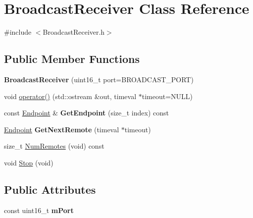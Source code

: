 \hypertarget{class_broadcast_receiver}{\section{Broadcast\-Receiver Class Reference}
\label{class_broadcast_receiver}
}


{\ttfamily \#include $<$Broadcast\-Receiver.\-h$>$}

\subsection*{Public Member Functions}
\begin{DoxyCompactItemize}
\item 
\hypertarget{class_broadcast_receiver_a9c3f8ebdef813f03edec75f88389a6ee}{{\bfseries Broadcast\-Receiver} (uint16\-\_\-t port=B\-R\-O\-A\-D\-C\-A\-S\-T\-\_\-\-P\-O\-R\-T)}\label{class_broadcast_receiver_a9c3f8ebdef813f03edec75f88389a6ee}

\item 
void \hyperlink{class_broadcast_receiver_ac2fa6c783d73121c800d3c015621964d}{operator()} (std\-::ostream \&out, timeval $\ast$timeout=N\-U\-L\-L)
\item 
\hypertarget{class_broadcast_receiver_aac4e2401b2cb7fdae40929bd896724f7}{const \hyperlink{class_endpoint}{Endpoint} \& {\bfseries Get\-Endpoint} (size\-\_\-t index) const }\label{class_broadcast_receiver_aac4e2401b2cb7fdae40929bd896724f7}

\item 
\hypertarget{class_broadcast_receiver_a4549672ea1b9b008f93b42329c8bea5f}{\hyperlink{class_endpoint}{Endpoint} {\bfseries Get\-Next\-Remote} (timeval $\ast$timeout)}\label{class_broadcast_receiver_a4549672ea1b9b008f93b42329c8bea5f}

\item 
size\-\_\-t \hyperlink{class_broadcast_receiver_a6e403e696a76c5bc8c2b9215c3d5704d}{Num\-Remotes} (void) const 
\item 
void \hyperlink{class_broadcast_receiver_ab0f0852ab37655f23bebaca888216502}{Stop} (void)
\end{DoxyCompactItemize}
\subsection*{Public Attributes}
\begin{DoxyCompactItemize}
\item 
\hypertarget{class_broadcast_receiver_a3e1de2825034cb6e2b15641c490d9381}{const uint16\-\_\-t {\bfseries m\-Port}}\label{class_broadcast_receiver_a3e1de2825034cb6e2b15641c490d9381}

\end{DoxyCompactItemize}
